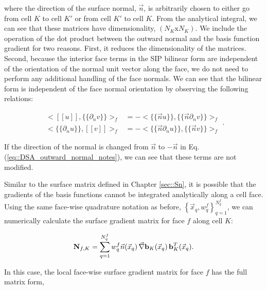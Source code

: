 \noindent where the direction of the surface normal, $\vec{n}$, is arbitrarily chosen to either go from cell $K$ to cell $K'$ or from cell $K'$ to cell $K$. From the analytical integral, we can see that these matrices have dimensionality, $(N_K \text{x} N_K )$. We include the operation of the dot product between the outward normal and the basis function gradient for two reasons. First, it reduces the dimensionality of the matrices. Second, because the interior face terms in the SIP bilinear form are independent of the orientation of the normal unit vector along the face, we do not need to perform any additional handling of the face normals. We can see that the bilinear form is independent of the face normal orientation by observing the following relations:

\begin{equation}
\label{eq::DSA_outward_normal_notes}
\begin{aligned}
\Big<  [\![   u ]\!] , \{\!\{   \partial_n v \}\!\}\Big>_{f}  &= - \Big<  \{\!\{ \vec{n}  u \}\!\} , \{\!\{  \vec{n} \partial_n v \}\!\}\Big>_{f} \\
\Big< \{\!\{   \partial_n u \}\!\} ,  [\![   v ]\!]\Big>_{f} &= - \Big<  \{\!\{ \vec{n} \partial_n  u \}\!\} , \{\!\{  \vec{n} v \}\!\}\Big>_{f}
\end{aligned}.
\end{equation}

\noindent If the direction of the normal is changed from $\vec{n}$ to $-\vec{n}$ in Eq. (\ref{eq::DSA_outward_normal_notes}), we can see that these terms are not modified. 

Similar to the surface matrix defined in Chapter \ref{sec::Sn}, it is possible that the gradients of the basis functions cannot be integrated analytically along a cell face. Using the same face-wise quadrature notation as before, $\left\{  \vec{x}_q , w_q^{f}  \right\}_{q=1}^{N_q^f}$, we can numerically calculate the surface gradient matrix for face $f$ along cell $K$:

\begin{equation}
\label{eq::DSA_surface_gradient_matrix_numerical}
{\bf N}_{f,K} =    \sum_{q = 1}^{N_q^f} w_{q}^f \vec{n} (\vec{x}_q) \, \vec{\nabla} {\bf b}_K (\vec{x}_q) \, {\bf b}_K^T (\vec{x}_q) .
\end{equation}

In this case, the local face-wise surface gradient matrix for face $f$ has the full matrix form,

